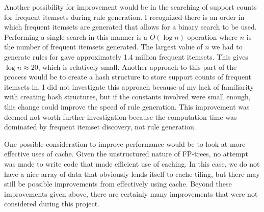 \documentclass[11pt]{article}
\begin{document}
Another possibility for improvement would be in the searching of support counts for frequent itemsets during rule generation. I recognized there is an
order in which frequent itemsets are generated that allows for a binary search to be used. Performing a single search in this manner is a $O(\log n)$
operation where $n$ is the number of frequent itemsets generated. The largest value of $n$ we had to generate rules for gave approximately 1.4 million
frequent itemsets. This gives $\log n \approx 20$, which is relatively small. Another approach to this part of the process would be to create a hash
structure to store support counts of frequent itemsets in. I did not investigate this approach because of my lack of familiarity with creating hash
structures, but if the constants involved were small enough, this change could improve the speed of rule generation. This improvement was deemed not
worth further investigation because the computation time was dominated by frequent itemset discovery, not rule generation.

One possible consideration to improve performance would be to look at more effective uses of cache. Given the unstructured
nature of FP-trees, no attempt was made to write code that made efficient use of caching. In this case, we do not have a nice array of data that
obviously lends itself to cache tiling, but there may still be possible improvements from effectively using cache. Beyond these improvements given
above, there are certainly many improvements that were not considered during this project.
\end{document}
